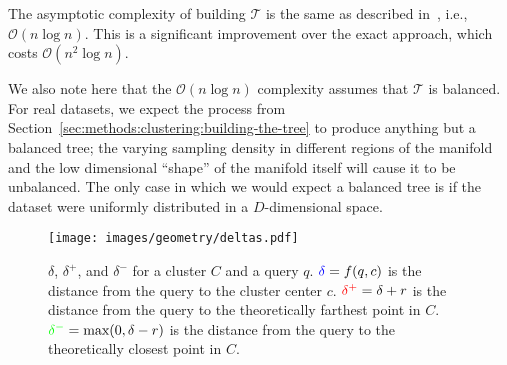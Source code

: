 The asymptotic complexity of building $\mathcal{T}$ is the same as described in~\cite{ishaq2019clustered}, i.e., $\mathcal{O}(n \log n)$.
This is a significant improvement over the exact approach, which costs $\mathcal{O}(n^2 \log n)$.

We also note here that the $\mathcal{O}(n \log n)$ complexity assumes that $\mathcal{T}$ is balanced.
For real datasets, we expect the process from Section~\ref{sec:methods:clustering:building-the-tree} to produce anything but a balanced tree; the varying sampling density in different regions of the manifold and the low dimensional ``shape'' of the manifold itself will cause it to be unbalanced.
The only case in which we would expect a balanced tree is if the dataset were uniformly distributed in a $D$-dimensional space.


\begin{figure}[t]
    \vskip -0.2in
    \centering
    \texttt{[image: images/geometry/deltas.pdf]}
    \caption{
        {\color{blue}$\delta$}, {\color{red}$\delta^{+}$}, and {\color{green}$\delta^{-}$} for a cluster $C$ and a query $q$.
        ${\color{blue}\delta} = f(q, c)$ is the distance from the query to the cluster center $c$.
        ${\color{red}\delta^{+}} = \delta + r$ is the distance from the query to the theoretically farthest point in $C$.
        ${\color{green}\delta^{-}} = \text{max}(0, \delta - r)$ is the distance from the query to the theoretically closest point in $C$.
    }
    \label{fig:methods:deltas}
\end{figure}
\FloatBarrier

